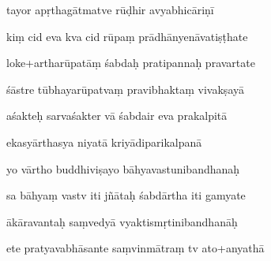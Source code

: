 \documentclass[article,12pt,a4paper]{memoir}%
\newcounter{parCount}
\begin{document}
	  
	  \pstart {} tayor apṛthagātmatve rūḍhir avyabhicāriṇī 
	{}
	\pend%
      

	  
	  \pstart \leavevmode%
	kiṃ cid eva kva cid rūpaṃ prādhānyenāvatiṣṭhate 
	{}
	\pend%
      

	  
	  \pstart {} loke+artharūpatāṃ śabdaḥ pratipannaḥ pravartate 
	{}
	\pend%
      

	  
	  \pstart \leavevmode%
	śāstre tūbhayarūpatvaṃ pravibhaktaṃ vivakṣayā 
	{}
	\pend%
      

	  
	  \pstart {} aśakteḥ sarvaśakter vā śabdair eva prakalpitā 
	{}
	\pend%
      

	  
	  \pstart \leavevmode%
	ekasyārthasya niyatā kriyādiparikalpanā 
	{}
	\pend%
      

	  
	  \pstart {} yo vārtho buddhiviṣayo bāhyavastunibandhanaḥ 
	{}
	\pend%
      

	  
	  \pstart \leavevmode%
	sa bāhyaṃ vastv iti jñātaḥ śabdārtha iti gamyate 
	{}
	\pend%
      

	  
	  \pstart {} ākāravantaḥ saṃvedyā vyaktismṛtinibandhanāḥ 
	{}
	\pend%
      

	  
	  \pstart \leavevmode%
	ete pratyavabhāsante saṃvinmātraṃ tv ato+anyathā 
	{}
	\pend%
      
\end{document}
